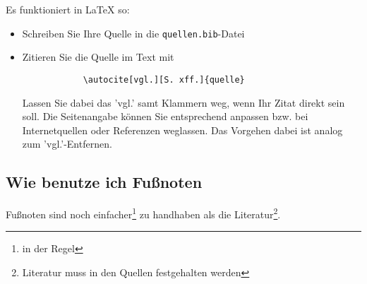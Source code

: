     Es funktioniert in \LaTeX{} so:
    \begin{itemize}
        \item Schreiben Sie Ihre Quelle in die \texttt{quellen.bib}-Datei
        \item Zitieren Sie die Quelle im Text mit \begin{verbatim}
            \autocite[vgl.][S. xff.]{quelle}
        \end{verbatim}
        Lassen Sie dabei das 'vgl.' samt Klammern weg, wenn Ihr Zitat direkt sein soll.
        Die Seitenangabe können Sie entsprechend anpassen bzw. bei Internetquellen oder Referenzen weglassen. Das Vorgehen dabei ist analog zum 'vgl.'-Entfernen.
    \end{itemize}
    \subsection{Wie benutze ich Fußnoten}
    Fußnoten sind noch einfacher\footnote{in der Regel} zu handhaben als die Literatur\footnote{Literatur muss in den Quellen festgehalten werden}.